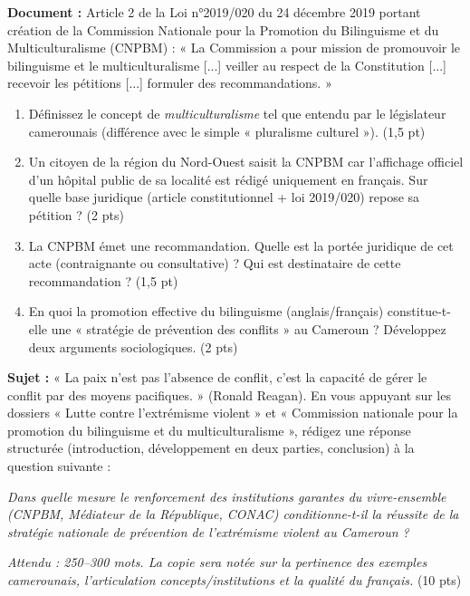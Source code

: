 \documentclass[11pt]{article}
\begin{document}
\begin{exercice}
\textbf{Document :} Article 2 de la Loi n°2019/020 du 24 décembre 2019 portant création de la Commission Nationale pour la Promotion du Bilinguisme et du Multiculturalisme (CNPBM) : « La Commission a pour mission de promouvoir le bilinguisme et le multiculturalisme [...] veiller au respect de la Constitution [...] recevoir les pétitions [...] formuler des recommandations. »

\begin{enumerate}
    \item Définissez le concept de \textit{multiculturalisme} tel que entendu par le législateur camerounais (différence avec le simple « pluralisme culturel »). (1,5 pt)
    \item Un citoyen de la région du Nord-Ouest saisit la CNPBM car l'affichage officiel d'un hôpital public de sa localité est rédigé uniquement en français. Sur quelle base juridique (article constitutionnel + loi 2019/020) repose sa pétition ? (2 pts)
    \item La CNPBM émet une recommandation. Quelle est la portée juridique de cet acte (contraignante ou consultative) ? Qui est destinataire de cette recommandation ? (1,5 pt)
    \item En quoi la promotion effective du bilinguisme (anglais/français) constitue-t-elle une « stratégie de prévention des conflits » au Cameroun ? Développez deux arguments sociologiques. (2 pts)
\end{enumerate}
\end{exercice}

\begin{exercice}
\textbf{Sujet :} « La paix n'est pas l'absence de conflit, c'est la capacité de gérer le conflit par des moyens pacifiques. » (Ronald Reagan). En vous appuyant sur les dossiers « Lutte contre l'extrémisme violent » et « Commission nationale pour la promotion du bilinguisme et du multiculturalisme », rédigez une réponse structurée (introduction, développement en deux parties, conclusion) à la question suivante :

\textit{Dans quelle mesure le renforcement des institutions garantes du vivre-ensemble (CNPBM, Médiateur de la République, CONAC) conditionne-t-il la réussite de la stratégie nationale de prévention de l'extrémisme violent au Cameroun ?}

\textit{Attendu : 250--300 mots. La copie sera notée sur la pertinence des exemples camerounais, l'articulation concepts/institutions et la qualité du français.} (10 pts)
\end{exercice}
\end{document}
